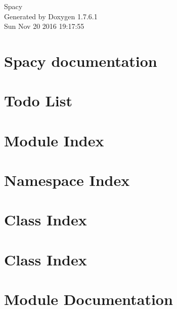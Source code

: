 \documentclass[a4paper]{book}
\begin{document}
\hypersetup{pageanchor=false,citecolor=blue}
\begin{titlepage}
\vspace*{7cm}
\begin{center}
{\Large \-Spacy }\\
\vspace*{1cm}
{\large \-Generated by Doxygen 1.7.6.1}\\
\vspace*{0.5cm}
{\small Sun Nov 20 2016 19:17:55}\\
\end{center}
\end{titlepage}
\clearemptydoublepage
{}
\tableofcontents
\clearemptydoublepage
{}
\hypersetup{pageanchor=true,citecolor=blue}
\chapter{\-Spacy documentation}
\label{index}\hypertarget{index}{}
\chapter{\-Todo \-List}
\label{todo}
\hypertarget{todo}{}

\chapter{\-Module \-Index}

\chapter{\-Namespace \-Index}

\chapter{\-Class \-Index}

\chapter{\-Class \-Index}

\chapter{\-Module \-Documentation}














\end{document}
